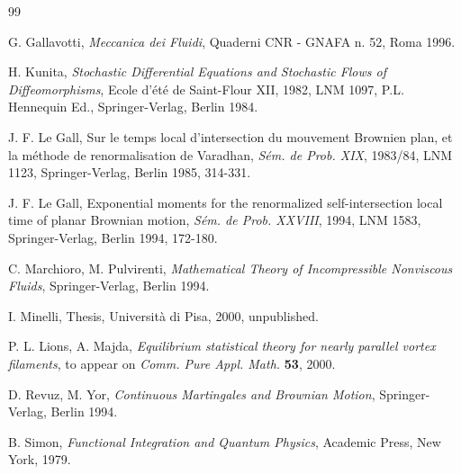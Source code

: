 \begin{thebibliography}{99}

  G. Gallavotti, \textit{Meccanica dei Fluidi}, Quaderni CNR -
GNAFA n. 52, Roma 1996.


  H. Kunita, \textit{Stochastic Differential Equations and
Stochastic Flows of Diffeomorphisms}, Ecole d'\'{e}t\'{e} de Saint-Flour
XII, 1982, LNM 1097, P.L. Hennequin Ed., Springer-Verlag, Berlin 1984.


  J. F. Le Gall, Sur le temps local d'intersection du
mouvement Brownien plan, et la m\'{e}thode de renormalisation de Varadhan, 
\textit{S\'{e}m. de Prob. XIX}, 1983/84, LNM 1123, Springer-Verlag, Berlin
1985, 314-331.



  J. F. Le Gall, Exponential moments for the
  renormalized self-intersection local time of planar Brownian motion,
\textit{S\'{e}m. de Prob. XXVIII}, 1994, LNM 1583, Springer-Verlag, Berlin
1994, 172-180.


  C. Marchioro, M. Pulvirenti, \textit{Mathematical Theory
of Incompressible Nonviscous Fluids}, Springer-Verlag, Berlin 1994.

 I. Minelli, Thesis, Universit\`a di Pisa, 2000, unpublished.

  P. L. Lions, A. Majda, \textit{Equilibrium statistical
    theory for nearly parallel vortex filaments}, to appear on \textit{Comm. Pure Appl. Math.%
} \textbf{53}, 2000.

  D. Revuz, M. Yor, \textit{Continuous Martingales and Brownian
Motion}, Springer-Verlag, Berlin 1994.

 B. Simon, \textit{Functional Integration and Quantum Physics},
  Academic  Press, New York, 1979.


\end{thebibliography}
